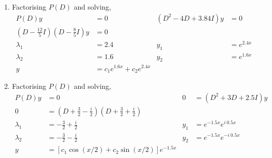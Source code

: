 \begin{enumerate}
    \item Factorising $ P(D) $ and solving,
          \begin{align}
              P(D)y                                                             & = 0                             & (D^{2} - 4D + 3.84I)y & = 0        \\
              \left( D - \frac{12}{5}I \right) \left( D - \frac{8}{5}I \right)y & = 0                                                                  \\
              \lambda_{1}                                                       & = 2.4                           & y_{1}                 & = e^{2.4x} \\
              \lambda_{2}                                                       & = 1.6                           & y_{2}                 & = e^{1.6x} \\
              y                                                                 & = c_{1}e^{1.6x} + c_{2}e^{2.4x}
          \end{align}

    \item Factorising $ P(D) $ and solving,
          \begin{align}
              P(D)y       & = 0                                                                                        & 0     & = (D^{2} + 3D + 2.5I)y  \\
              0           & = \left( D + \frac{3}{2} - \frac{i}{2} \right)\left( D + \frac{3}{2} + \frac{i}{2} \right)                                   \\
              \lambda_{1} & = - \frac{3}{2} + \frac{i}{2}                                                              & y_{1} & = e^{-1.5x}e^{i\ 0.5x}  \\
              \lambda_{2} & = - \frac{3}{2} - \frac{i}{2}                                                              & y_{2} & = e^{-1.5x}e^{-i\ 0.5x} \\
              y           & = [c_{1}\cos(x/2) + c_{2}\sin(x/2)]e^{-1.5x}
          \end{align}


\end{enumerate}
